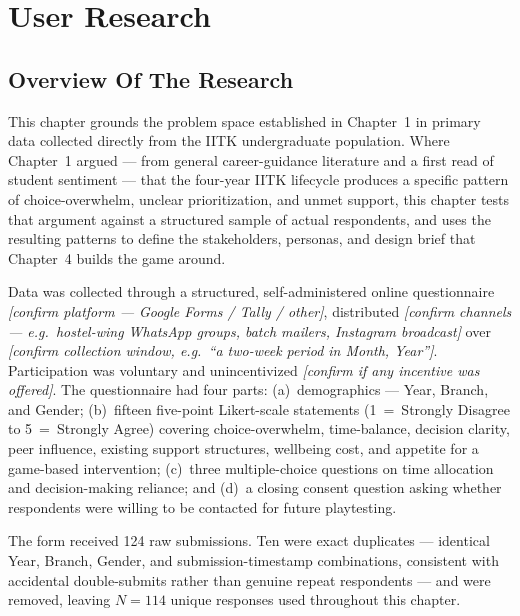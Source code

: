 
\chapter{User Research}\doublespacing

\label{Chapter3}



\section{Overview Of The Research}

This chapter grounds the problem space established in Chapter~1 in primary data collected directly from the IITK undergraduate population. Where Chapter~1 argued --- from general career-guidance literature and a first read of student sentiment --- that the four-year IITK lifecycle produces a specific pattern of choice-overwhelm, unclear prioritization, and unmet support, this chapter tests that argument against a structured sample of actual respondents, and uses the resulting patterns to define the stakeholders, personas, and design brief that Chapter~4 builds the game around.

Data was collected through a structured, self-administered online questionnaire \textit{[confirm platform --- Google Forms / Tally / other]}, distributed \textit{[confirm channels --- e.g.\ hostel-wing WhatsApp groups, batch mailers, Instagram broadcast]} over \textit{[confirm collection window, e.g.\ ``a two-week period in Month, Year'']}. Participation was voluntary and unincentivized \textit{[confirm if any incentive was offered]}. The questionnaire had four parts: (a)~demographics --- Year, Branch, and Gender; (b)~fifteen five-point Likert-scale statements (1~=~Strongly Disagree to 5~=~Strongly Agree) covering choice-overwhelm, time-balance, decision clarity, peer influence, existing support structures, wellbeing cost, and appetite for a game-based intervention; (c)~three multiple-choice questions on time allocation and decision-making reliance; and (d)~a closing consent question asking whether respondents were willing to be contacted for future playtesting.

The form received 124 raw submissions. Ten were exact duplicates --- identical Year, Branch, Gender, and submission-timestamp combinations, consistent with accidental double-submits rather than genuine repeat respondents --- and were removed, leaving $N = 114$ unique responses used throughout this chapter.

